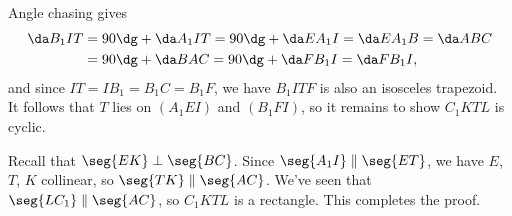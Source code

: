 Angle chasing gives
\begin{align*}
    \da B_1IT&=90\dg+\da A_1IT=90\dg+\da EA_1I=\da EA_1B=\da ABC\\
    &=90\dg+\da BAC=90\dg+\da FB_1I=\da FB_1I,
\end{align*}
and since $IT=IB_1=B_1C=B_1F$, we have $B_1ITF$ is also an isosceles trapezoid. It follows that $T$ lies on $(A_1EI)$ and $(B_1FI)$, so it remains to show $C_1KTL$ is cyclic.

Recall that $\seg{EK}\perp\seg{BC}$. Since $\seg{A_1I}\parallel\seg{ET}$, we have $E$, $T$, $K$ collinear, so $\seg{TK}\parallel\seg{AC}$. We've seen that $\seg{LC_1}\parallel\seg{AC}$, so $C_1KTL$ is a rectangle. This completes the proof.
